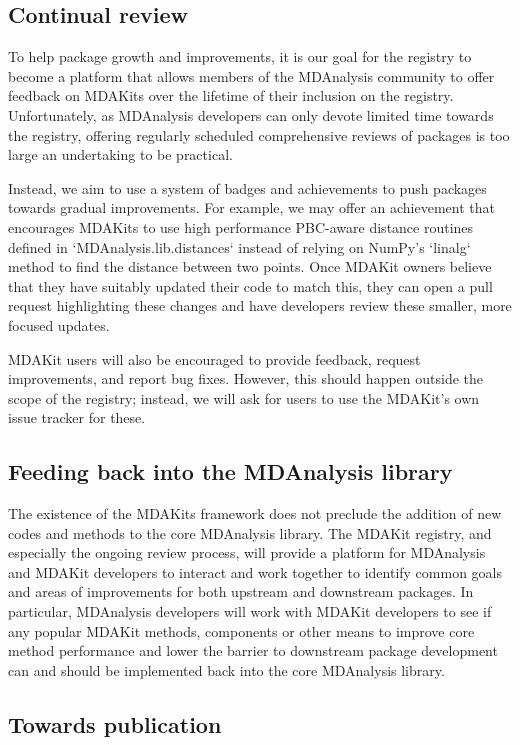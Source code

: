 \documentclass{article}
\begin{document}
\subsection{Continual review}

To help package growth and improvements, it is our goal for the registry to become a platform that allows members of the MDAnalysis community to offer feedback on MDAKits over the lifetime of their inclusion on the registry. Unfortunately, as MDAnalysis developers can only devote limited time towards the registry, offering regularly scheduled comprehensive reviews of packages is too large an undertaking to be practical.


Instead, we aim to use a system of badges and achievements to push packages towards gradual improvements. For example, we may offer an achievement that encourages MDAKits to use high performance PBC-aware distance routines defined in `MDAnalysis.lib.distances` instead of relying on NumPy’s `linalg` method to find the distance between two points. Once MDAKit owners believe that they have suitably updated their code to match this, they can open a pull request highlighting these changes and have developers review these smaller, more focused updates.

MDAKit users will also be encouraged to provide feedback, request improvements, and report bug fixes. However, this should happen outside the scope of the registry; instead, we will ask for users to use the MDAKit’s own issue tracker for these.

\subsection{Feeding back into the MDAnalysis library}

The existence of the MDAKits framework does not preclude the addition of new codes and methods to the core MDAnalysis library. The MDAKit registry, and especially the ongoing review process, will provide a platform for MDAnalysis and MDAKit developers to interact and work together to identify common goals and areas of improvements for both upstream and downstream packages. In particular, MDAnalysis developers will work with MDAKit developers to see if any popular MDAKit methods, components or other means to improve core method performance and lower the barrier to downstream package development can and should be implemented back into the core MDAnalysis library.

\subsection{Towards publication}
\end{document}
